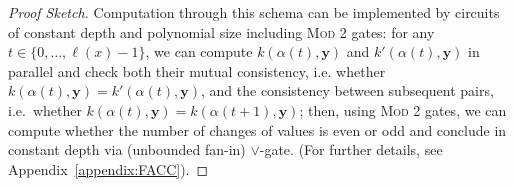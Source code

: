 \documentclass[11pt, oneside]{article}
\newcommand{\tu}[1]{\mathbf{#1}}
\theoremstyle{definition}
\begin{document}
\begin{proof}[Proof Sketch]
    Computation through this schema can be implemented by circuits of constant depth and polynomial size including \textsc{Mod 2} gates: 
    for any $t\in \{0,\dots, \ell(x)-1\}$, we can compute $k(\alpha(t), \tu y)$ and $k'(\alpha(t), \tu y)$ in parallel and check both their mutual consistency, i.e. whether $k(\alpha(t), \tu y)=k'(\alpha(t),\tu y)$, and the consistency between subsequent pairs, i.e.~whether $k(\alpha(t), \tu y)=k(\alpha(t+1), \tu y)$; then, using \textsc{Mod 2} gates, we can compute whether the number of changes of values is even or odd and conclude in constant depth via (unbounded fan-in) $\vee$-gate. 
    (For further details, see Appendix~\ref{appendix:FACC}).
\end{proof}




\end{document}
